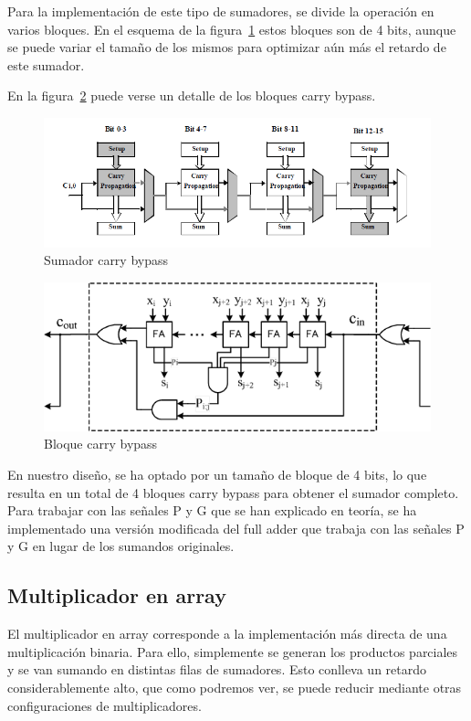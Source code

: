 \documentclass[a4paper,12pt]{article}
\begin{document}
Para la implementación de este tipo de sumadores, se divide la operación en varios bloques. En el esquema de la figura~\ref{fig:carry_bypass_adder} estos bloques son de 4 bits, aunque se puede variar el tamaño de los mismos para optimizar aún más el retardo de este sumador.

En la figura~\ref{fig:carry_skip_block} puede verse un detalle de los bloques carry bypass.

\begin{figure}[hbt]
\includegraphics[width=\textwidth]{img/carrybypass.png} 
\caption{Sumador carry bypass} \label{fig:carry_bypass_adder}
\end{figure}

\begin{figure}[hbt]
\includegraphics[width=\textwidth]{img/carryskipblock.png} 
\caption{Bloque carry bypass} \label{fig:carry_skip_block}
\end{figure}

En nuestro diseño, se ha optado por un tamaño de bloque de 4 bits, lo que resulta en un total de 4 bloques carry bypass para obtener el sumador completo. Para trabajar con las señales P y G que se han explicado en teoría, se ha implementado una versión modificada del full adder que trabaja con las señales P y G en lugar de los sumandos originales.
\clearpage
\subsection{Multiplicador en array}
El multiplicador en array corresponde a la implementación más directa de una multiplicación binaria. Para ello, simplemente se generan los productos parciales y se van sumando en distintas filas de sumadores. Esto conlleva un retardo considerablemente alto, que como podremos ver, se puede reducir mediante otras configuraciones de multiplicadores.
\end{document}
